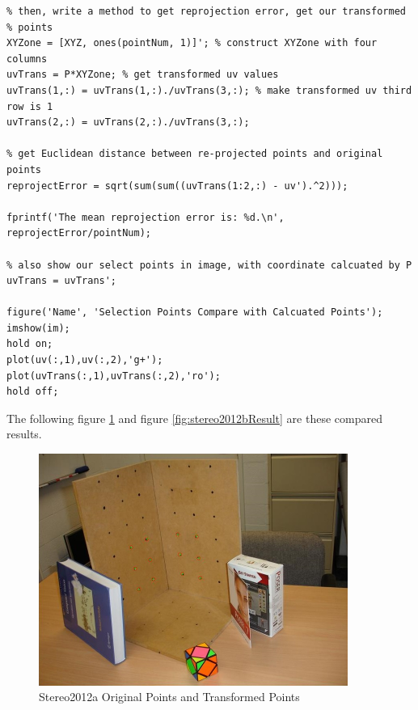 \documentclass[12pt]{article}
\begin{document}
\begin{lstlisting}
% then, write a method to get reprojection error, get our transformed
% points
XYZone = [XYZ, ones(pointNum, 1)]'; % construct XYZone with four columns
uvTrans = P*XYZone; % get transformed uv values
uvTrans(1,:) = uvTrans(1,:)./uvTrans(3,:); % make transformed uv third row is 1
uvTrans(2,:) = uvTrans(2,:)./uvTrans(3,:);

% get Euclidean distance between re-projected points and original points
reprojectError = sqrt(sum(sum((uvTrans(1:2,:) - uv').^2)));
    
fprintf('The mean reprojection error is: %d.\n', reprojectError/pointNum);
    
% also show our select points in image, with coordinate calcuated by P
uvTrans = uvTrans';
    
figure('Name', 'Selection Points Compare with Calcuated Points');
imshow(im);
hold on;
plot(uv(:,1),uv(:,2),'g+');
plot(uvTrans(:,1),uvTrans(:,2),'ro');
hold off;
\end{lstlisting}

The following figure \ref{fig:stereo2012aResult} and figure \ref{fig:stereo2012bResult} are these compared results.

\begin{figure}[h]
    \centering
    \includegraphics[width=0.9\textwidth]{stereo2012aResult.jpg}
    \caption{Stereo2012a Original Points and Transformed Points}
    \label{fig:stereo2012aResult}
\end{figure}
\end{document}
